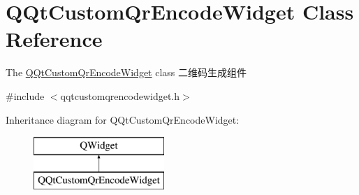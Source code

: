 \hypertarget{class_q_qt_custom_qr_encode_widget}{}\section{Q\+Qt\+Custom\+Qr\+Encode\+Widget Class Reference}
\label{class_q_qt_custom_qr_encode_widget}


The \mbox{\hyperlink{class_q_qt_custom_qr_encode_widget}{Q\+Qt\+Custom\+Qr\+Encode\+Widget}} class 二维码生成组件  




{\ttfamily \#include $<$qqtcustomqrencodewidget.\+h$>$}

Inheritance diagram for Q\+Qt\+Custom\+Qr\+Encode\+Widget\+:\begin{figure}[H]
\begin{center}
\leavevmode
\includegraphics[height=2.000000cm]{class_q_qt_custom_qr_encode_widget}
\end{center}
\end{figure}
